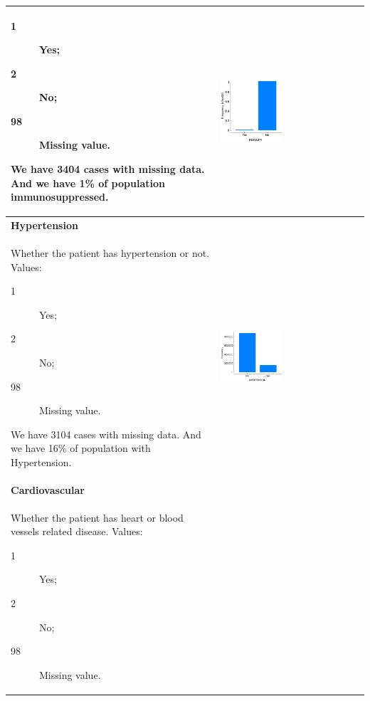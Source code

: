 \begin{longtable}{P{0.45\textwidth}P{0.45\textwidth}}
\begin{description}
    \item[1] Yes;
    \item[2] No;
    \item[98] Missing value.
\end{description}
We have 3404 cases with missing data.
And we have 1\% of population immunosuppressed.
& \includegraphics[width=0.44\textwidth]{img/appendix/feature_inmsupr.png} 
\\ \hline
\textbf{Hypertension} & \\
Whether the patient has hypertension or not. Values:
\begin{description}
    \item[1] Yes;
    \item[2] No;
    \item[98] Missing value.
\end{description}
We have 3104 cases with missing data.
And we have 16\% of population with Hypertension.
& \includegraphics[width=0.44\textwidth]{img/appendix/feature_hypertension.png} 
\\ \hline
\textbf{Cardiovascular} & \\
Whether the patient has heart or blood vessels related disease. Values:
\begin{description}
    \item[1] Yes;
    \item[2] No;
    \item[98] Missing value.

\end{description}
\end{longtable}

